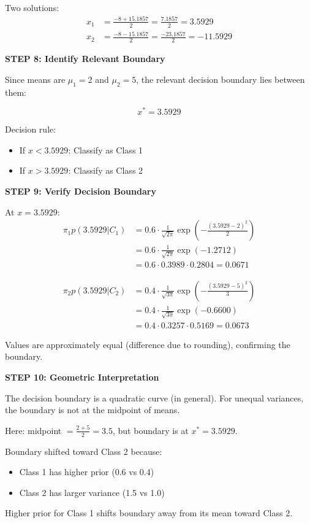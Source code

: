 \documentclass[12pt]{article}
\begin{document}
\begin{solution}
Two solutions:
\begin{align*}
x_1 &= \frac{-8 + 15.1857}{2} = \frac{7.1857}{2} = 3.5929 \\
x_2 &= \frac{-8 - 15.1857}{2} = \frac{-23.1857}{2} = -11.5929
\end{align*}

\textbf{STEP 8: Identify Relevant Boundary}

Since means are $\mu_1 = 2$ and $\mu_2 = 5$, the relevant decision boundary lies between them:

\[\boxed{x^* = 3.5929}\]

Decision rule:
\begin{itemize}
\item If $x < 3.5929$: Classify as Class 1
\item If $x > 3.5929$: Classify as Class 2
\end{itemize}

\textbf{STEP 9: Verify Decision Boundary}

At $x = 3.5929$:
\begin{align*}
\pi_1 p(3.5929|C_1) &= 0.6 \cdot \frac{1}{\sqrt{2\pi}} \exp\left(-\frac{(3.5929-2)^2}{2}\right) \\
&= 0.6 \cdot \frac{1}{\sqrt{2\pi}} \exp(-1.2712) \\
&= 0.6 \cdot 0.3989 \cdot 0.2804 = 0.0671
\end{align*}

\begin{align*}
\pi_2 p(3.5929|C_2) &= 0.4 \cdot \frac{1}{\sqrt{3\pi}} \exp\left(-\frac{(3.5929-5)^2}{3}\right) \\
&= 0.4 \cdot \frac{1}{\sqrt{3\pi}} \exp(-0.6600) \\
&= 0.4 \cdot 0.3257 \cdot 0.5169 = 0.0673
\end{align*}

Values are approximately equal (difference due to rounding), confirming the boundary.

\textbf{STEP 10: Geometric Interpretation}

The decision boundary is a quadratic curve (in general). For unequal variances, the boundary is not at the midpoint of means.

Here: midpoint $= \frac{2+5}{2} = 3.5$, but boundary is at $x^* = 3.5929$.

Boundary shifted toward Class 2 because:
\begin{itemize}
\item Class 1 has higher prior (0.6 vs 0.4)
\item Class 2 has larger variance (1.5 vs 1.0)
\end{itemize}

Higher prior for Class 1 shifts boundary away from its mean toward Class 2.

\end{solution}
\end{document}
